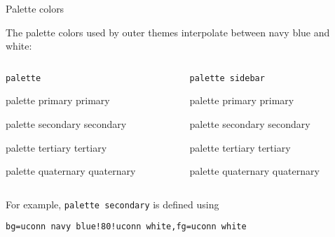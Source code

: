 \documentclass{beamer}
\begin{document}
\begin{frame}[fragile]{Palette colors}

The palette colors used by outer themes interpolate between navy blue and white:

\vfill

\begin{columns}
\begin{column}{.5\textwidth}

\centering
\verb|palette|
\vspace{1ex}

\begin{beamercolorbox}[sep=4pt,center]{palette primary}
primary
\end{beamercolorbox}

\begin{beamercolorbox}[sep=4pt,center]{palette secondary}
secondary
\end{beamercolorbox}

\begin{beamercolorbox}[sep=4pt,center]{palette tertiary}
tertiary
\end{beamercolorbox}

\begin{beamercolorbox}[sep=4pt,center]{palette quaternary}
quaternary
\end{beamercolorbox}

\end{column}
\begin{column}{.5\textwidth}

\centering
\verb|palette sidebar|
\vspace{1ex}

\begin{beamercolorbox}[sep=4pt,center]{palette primary}
primary
\end{beamercolorbox}

\begin{beamercolorbox}[sep=4pt,center]{palette secondary}
secondary
\end{beamercolorbox}

\begin{beamercolorbox}[sep=4pt,center]{palette tertiary}
tertiary
\end{beamercolorbox}

\begin{beamercolorbox}[sep=4pt,center]{palette quaternary}
quaternary
\end{beamercolorbox}

\end{column}
\end{columns}

\vspace{2ex}
For example, \verb|palette secondary| is defined using
\begin{verbatim}
bg=uconn navy blue!80!uconn white,fg=uconn white
\end{verbatim}

\end{frame}
\end{document}
